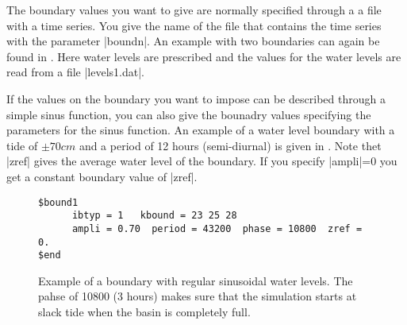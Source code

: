 The boundary values you want to give are normally specified through 
a a file with a time series. You give the name of the file that contains
the time series with the parameter |boundn|. 
An example with two boundaries can again be found in 
\Fig{}. Here water levels are prescribed and the values
for the water levels are read from a file |levels1.dat|.

If the values on the boundary
you want to impose can be described through a simple sinus function, you
can also give the bounadry values specifying the parameters for the
sinus function. An example of a water level boundary with a tide of
$\pm 70 cm$ and a period of 12 hours (semi-diurnal) is given in
\Fig{}. Note thet |zref| gives the average water level of the
boundary. If you specify |ampli|=0 you get a constant boundary value
of |zref|.

\begin{figure}[ht]
\begin{verbatim}
$bound1
      ibtyp = 1   kbound = 23 25 28
      ampli = 0.70  period = 43200  phase = 10800  zref = 0.
$end
\end{verbatim}
\caption{Example of a boundary with regular sinusoidal water levels.
The pahse of 10800 (3 hours) makes sure that the simulation starts at
slack tide when the basin is completely full.}
\label{fig:bound}
\end{figure}








